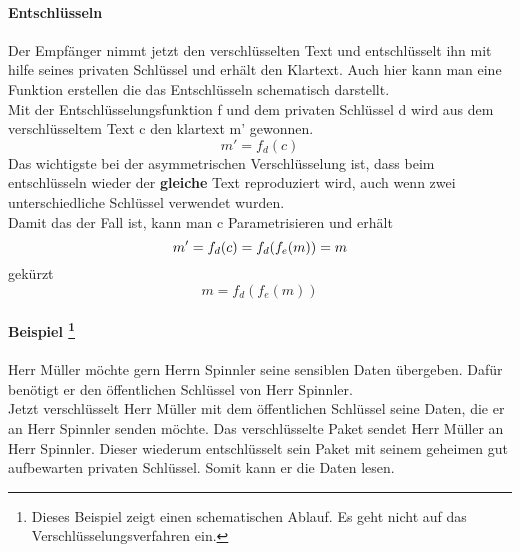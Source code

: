 \paragraph{Entschlüsseln}
Der Empfänger nimmt jetzt den verschlüsselten Text und entschlüsselt ihn mit hilfe seines privaten Schlüssel und erhält den Klartext.
Auch hier kann man eine Funktion erstellen die das Entschlüsseln schematisch darstellt.\\
Mit der Entschlüsselungsfunktion f und dem privaten Schlüssel d wird aus dem verschlüsseltem Text c den klartext m' gewonnen.
\begin{equation*}
  m' = f_d (c) 
  \label{eqn:asy_entsch}
\end{equation*}
Das wichtigste bei der asymmetrischen Verschlüsselung ist, dass beim entschlüsseln wieder der \textbf{gleiche} Text reproduziert wird, auch wenn zwei unterschiedliche Schlüssel verwendet wurden.\\
Damit das der Fall ist, kann man c Parametrisieren und erhält
\begin{equation*}
  m' = f_d (c) = f_d (f_e (m) ) = m \\
  \label{eqn:asy_togh}
\end{equation*}
gekürzt\\
\begin{equation*}
  m = f_d ( f_e (m) )
  \label{eqn:asy_togh_shortForm}
\end{equation*}
\paragraph{Beispiel \footnote{Dieses Beispiel zeigt einen schematischen Ablauf. Es geht nicht auf das Verschlüsselungsverfahren ein.} }
Herr Müller möchte gern Herrn Spinnler seine sensiblen Daten übergeben. Dafür benötigt er den öffentlichen Schlüssel von Herr Spinnler.\\
Jetzt verschlüsselt Herr Müller mit dem öffentlichen Schlüssel seine Daten, die er an Herr Spinnler senden möchte. Das verschlüsselte Paket sendet Herr Müller an Herr Spinnler. Dieser wiederum entschlüsselt sein Paket mit seinem geheimen gut aufbewarten privaten Schlüssel. Somit kann er die Daten lesen.


